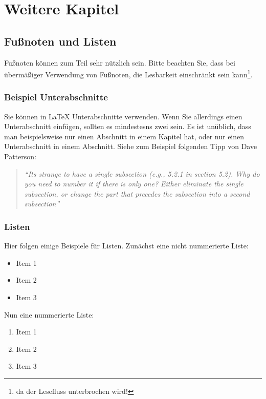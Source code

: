 \chapter{Weitere Kapitel}
\label{cha:weitere_kapitel}

\section{Fußnoten und Listen} %
\label{sec:fussnoten_listen}
Fußnoten können zum Teil sehr nützlich sein. Bitte beachten Sie, dass bei übermäßiger Verwendung von Fußnoten, die Lesbarkeit einschränkt sein kann\footnote{ da der Lesefluss unterbrochen wird!}. 

\subsection{Beispiel Unterabschnitte} %
\label{sub:bsp_unterabschnitt}
Sie können in \LaTeX{} Unterabschnitte verwenden. Wenn Sie allerdings einen Unterabschnitt einfügen, sollten es mindestesns zwei sein. Es ist unüblich, dass man beispielsweise nur einen Abschnitt in einem Kapitel hat, oder nur einen Unterabschnitt in einem Abschnitt. Siehe zum Beispiel folgenden Tipp von Dave Patterson: 

\begin{quotation}
	\emph{``Its strange to have a single subsection (e.g., 5.2.1 in section 5.2). Why do you need to number it if there is only one? Either eliminate the single subsection, or change the part that precedes the subsection into a second subsection''}
	\citep{Patterson2013}
\end{quotation} 



\subsection{Listen} %
\label{sub:listen}
Hier folgen einige Beispiele für Listen. Zunächst eine nicht nummerierte Liste: 

\begin{itemize}
	\item Item 1
	\item Item 2
	\item Item 3
\end{itemize}

Nun eine nummerierte Liste:

\begin{enumerate}
	\item Item 1
	\item Item 2
	\item Item 3
\end{enumerate}

